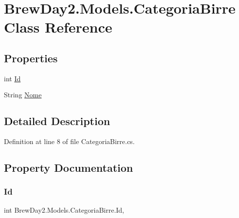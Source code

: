 \hypertarget{class_brew_day2_1_1_models_1_1_categoria_birre}{}\section{Brew\+Day2.\+Models.\+Categoria\+Birre Class Reference}
\label{class_brew_day2_1_1_models_1_1_categoria_birre}
\subsection*{Properties}
\begin{DoxyCompactItemize}
\item 
int \mbox{\hyperlink{class_brew_day2_1_1_models_1_1_categoria_birre_ad57e2dded9bd974df6473f177a077003}{Id}}
\item 
String \mbox{\hyperlink{class_brew_day2_1_1_models_1_1_categoria_birre_a29c18046151f05ba12aee8aa0e43fec4}{Nome}}
\end{DoxyCompactItemize}


\subsection{Detailed Description}


Definition at line 8 of file Categoria\+Birre.\+cs.



\subsection{Property Documentation}
\mbox{\label{class_brew_day2_1_1_models_1_1_categoria_birre_ad57e2dded9bd974df6473f177a077003}} 
\subsubsection{\texorpdfstring{Id}{Id}}
{\footnotesize\ttfamily int Brew\+Day2.\+Models.\+Categoria\+Birre.\+Id\hspace{0.3cm}{\ttfamily [get]}, {\ttfamily [set]}}



